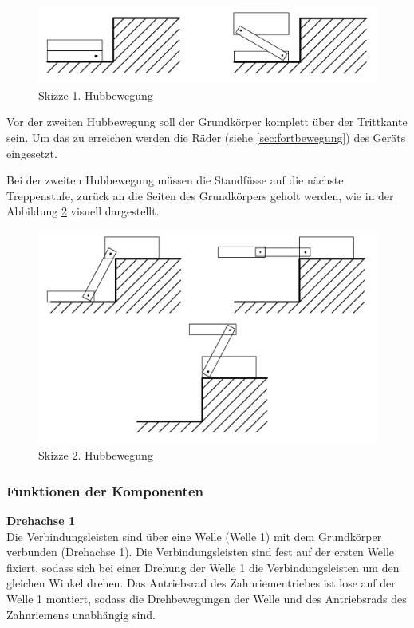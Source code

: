 \begin{figure}[H]
  \includegraphics[width=1\textwidth]{img/Treppensteigen/1. Hubbewegung Skizze.png}
  \centering
  \caption{Skizze 1. Hubbewegung}
  \label{fig:1-hubbewegung}
\end{figure}
 
Vor der zweiten Hubbewegung soll der Grundkörper komplett über der Trittkante sein. Um das zu erreichen werden die Räder (siehe \ref{sec:fortbewegung}) des Geräts eingesetzt.
 
Bei der zweiten Hubbewegung müssen die Standfüsse auf die nächste Treppenstufe, zurück an die Seiten des Grundkörpers geholt werden, wie in der Abbildung \ref{fig:2-hubbewegung} visuell dargestellt.

\begin{figure}[H]
  \includegraphics[width=1\textwidth]{img/Treppensteigen/2. Hubbewegung Skizze.png}
  \centering
  \caption{Skizze 2. Hubbewegung}
  \label{fig:2-hubbewegung}
\end{figure}

\newpage

\subsubsection{Funktionen der Komponenten}
\textbf{Drehachse 1}\\
Die Verbindungsleisten sind über eine Welle (Welle 1) mit dem Grundkörper verbunden (Drehachse 1). Die Verbindungsleisten sind fest auf der ersten Welle fixiert, sodass sich bei einer Drehung der Welle 1 die Verbindungsleisten um den gleichen Winkel drehen. Das Antriebsrad des Zahnriementriebes ist lose auf der Welle 1 montiert, sodass die Drehbewegungen der Welle und des Antriebsrads des Zahnriemens unabhängig sind.\\

